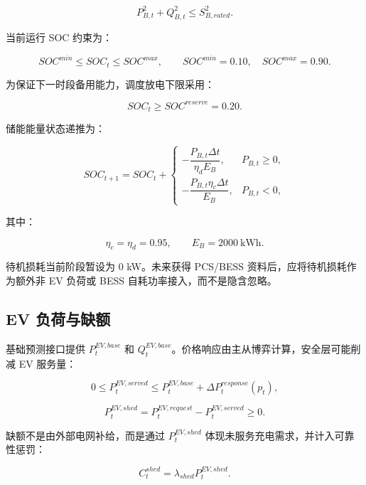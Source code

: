 \documentclass[UTF8,a4paper,11pt]{ctexart}
\begin{document}
\begin{equation}
P_{B,t}^2+Q_{B,t}^2\leq S_{B,rated}^2.
\end{equation}

当前运行 SOC 约束为：

\begin{equation}
SOC^{min}\leq SOC_t\leq SOC^{max},
\qquad
SOC^{min}=0.10,\quad SOC^{max}=0.90.
\end{equation}

为保证下一时段备用能力，调度放电下限采用：

\begin{equation}
SOC_t\geq SOC^{reserve}=0.20.
\end{equation}

储能能量状态递推为：

\begin{equation}
SOC_{t+1}=SOC_t+
\begin{cases}
-\dfrac{P_{B,t}\Delta t}{\eta_d E_B},&P_{B,t}\geq0,\\[6pt]
-\dfrac{P_{B,t}\eta_c\Delta t}{E_B},&P_{B,t}<0,
\end{cases}
\end{equation}

其中：

\begin{equation}
\eta_c=\eta_d=0.95,\qquad E_B=2000\ \text{kWh}.
\end{equation}

待机损耗当前阶段暂设为 0 kW。未来获得 PCS/BESS 资料后，应将待机损耗作为额外非 EV 负荷或 BESS 自耗功率接入，而不是隐含忽略。

\subsection{EV 负荷与缺额}

基础预测接口提供 $P^{EV,base}_t$ 和 $Q^{EV,base}_t$。价格响应由主从博弈计算，安全层可能削减 EV 服务量：

\begin{equation}
0\leq P^{EV,served}_t\leq P^{EV,base}_t+\Delta P^{response}_t(p_t),
\end{equation}

\begin{equation}
P^{EV,shed}_t=P^{EV,request}_t-P^{EV,served}_t\geq0.
\end{equation}

缺额不是由外部电网补给，而是通过 $P^{EV,shed}_t$ 体现未服务充电需求，并计入可靠性惩罚：

\begin{equation}
C^{shed}_t=\lambda_{shed}P^{EV,shed}_t.
\end{equation}
\end{document}
